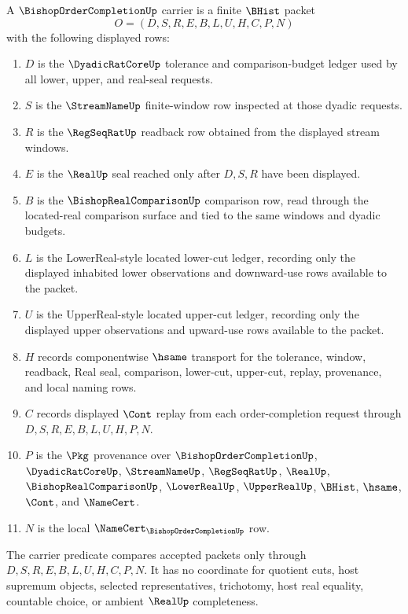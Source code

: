 \begin{definition}
\label{def:bishop-order-completion-carrier}
A $\BishopOrderCompletionUp$ carrier is a finite $\BHist$ packet
$$
O=(D,S,R,E,B,L,U,H,C,P,N)
$$
with the following displayed rows:
\begin{enumerate}
\item $D$ is the $\DyadicRatCoreUp$ tolerance and comparison-budget ledger used by all lower, upper, and real-seal requests.
\item $S$ is the $\StreamNameUp$ finite-window row inspected at those dyadic requests.
\item $R$ is the $\RegSeqRatUp$ readback row obtained from the displayed stream windows.
\item $E$ is the $\RealUp$ seal reached only after $D,S,R$ have been displayed.
\item $B$ is the $\BishopRealComparisonUp$ comparison row, read through the located-real comparison surface and tied to the same windows and dyadic budgets.
\item $L$ is the LowerReal-style located lower-cut ledger, recording only the displayed inhabited lower observations and downward-use rows available to the packet.
\item $U$ is the UpperReal-style located upper-cut ledger, recording only the displayed upper observations and upward-use rows available to the packet.
\item $H$ records componentwise $\hsame$ transport for the tolerance, window, readback, Real seal, comparison, lower-cut, upper-cut, replay, provenance, and local naming rows.
\item $C$ records displayed $\Cont$ replay from each order-completion request through $D,S,R,E,B,L,U,H,P,N$.
\item $P$ is the $\Pkg$ provenance over $\BishopOrderCompletionUp$, $\DyadicRatCoreUp$, $\StreamNameUp$, $\RegSeqRatUp$, $\RealUp$, $\BishopRealComparisonUp$, $\LowerRealUp$, $\UpperRealUp$, $\BHist$, $\hsame$, $\Cont$, and $\NameCert$.
\item $N$ is the local $\NameCert_{\BishopOrderCompletionUp}$ row.
\end{enumerate}
The carrier predicate compares accepted packets only through $D,S,R,E,B,L,U,H,C,P,N$. It has no coordinate for quotient cuts, host supremum objects, selected representatives, trichotomy, host real equality, countable choice, or ambient $\RealUp$ completeness.
\end{definition}

